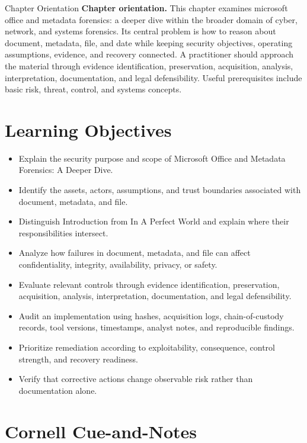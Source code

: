 \documentclass[11pt,letterpaper]{article}
\title{\CornellDocumentTitle}
\author{}
\date{}
\begin{document}
\maketitle
\begin{CornellOverviewBox}{Chapter Orientation}
\textbf{Chapter orientation.} This chapter examines microsoft office and metadata forensics: a deeper dive within the broader domain of cyber, network, and systems forensics. Its central problem is how to reason about document, metadata, file, and date while keeping security objectives, operating assumptions, evidence, and recovery connected. A practitioner should approach the material through evidence identification, preservation, acquisition, analysis, interpretation, documentation, and legal defensibility. Useful prerequisites include basic risk, threat, control, and systems concepts.
\end{CornellOverviewBox}
\section*{Learning Objectives}
\begin{itemize}
\item Explain the security purpose and scope of Microsoft Office and Metadata Forensics: A Deeper Dive.
\item Identify the assets, actors, assumptions, and trust boundaries associated with document, metadata, and file.
\item Distinguish Introduction from In A Perfect World and explain where their responsibilities intersect.
\item Analyze how failures in document, metadata, and file can affect confidentiality, integrity, availability, privacy, or safety.
\item Evaluate relevant controls through evidence identification, preservation, acquisition, analysis, interpretation, documentation, and legal defensibility.
\item Audit an implementation using hashes, acquisition logs, chain-of-custody records, tool versions, timestamps, analyst notes, and reproducible findings.
\item Prioritize remediation according to exploitability, consequence, control strength, and recovery readiness.
\item Verify that corrective actions change observable risk rather than documentation alone.
\end{itemize}
\section*{Cornell Cue-and-Notes}
\end{document}
